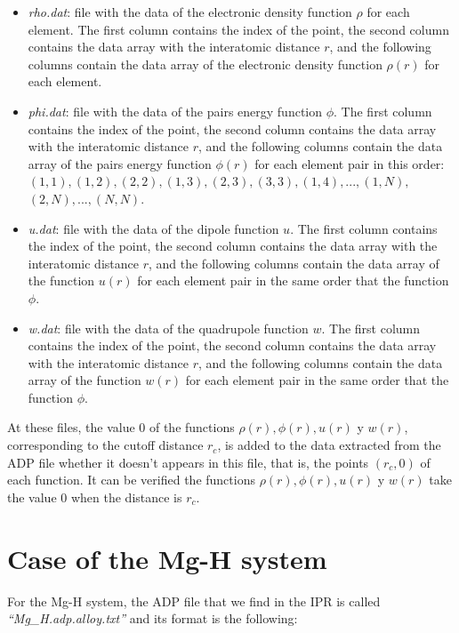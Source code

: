 \documentclass{article}
\begin{document}
\begin{itemize}
	\item \textit{rho.dat}: file with the data of the electronic density function $\rho$ for each element. The first column contains the index of the point, the second column contains the data array with the interatomic distance $r$, and the following columns contain the data array of the electronic density function $\rho(r)$ for each element.  
	
	\item \textit{phi.dat}: file with the data of the pairs energy function $\phi$. The first column contains the index of the point, the second column contains the data array with the interatomic distance $r$, and the following columns contain the data array of the pairs energy function $\phi(r)$ for each element pair in this order: $(1,1),(1,2),(2,2),(1,3),(2,3),(3,3),(1,4),...,(1,N),$ $(2,N),...,(N,N)$.
	
	\item \textit{u.dat}: file with the data of the dipole function $u$. The first column contains the index of the point, the second column contains the data array with the interatomic distance $r$, and the following columns contain the data array of the function $u(r)$ for each element pair in the same order that the function $\phi$.
	
	\item \textit{w.dat}: file with the data of the quadrupole function $w$. The first column contains the index of the point, the second column contains the data array with the interatomic distance $r$, and the following columns contain the data array of the function $w(r)$ for each element pair in the same order that the function $\phi$.
\end{itemize}

At these files, the value 0 of the functions $\rho(r),\phi(r),u(r)$ y $w(r)$, corresponding to the cutoff distance $r_{c}$, is added to the data extracted from the ADP file whether it doesn't appears in this file, that is, the points $(r_c, 0)$ of each function. It can be verified the functions $\rho(r),\phi(r),u(r)$ y $w(r)$ take the value 0 when the distance is $r_c$.




\section{Case of the Mg-H system}

For the Mg-H system, the ADP file that we find in the IPR is called \textit{``Mg\_H.adp.alloy.txt''} and its format is the following:
\end{document}
